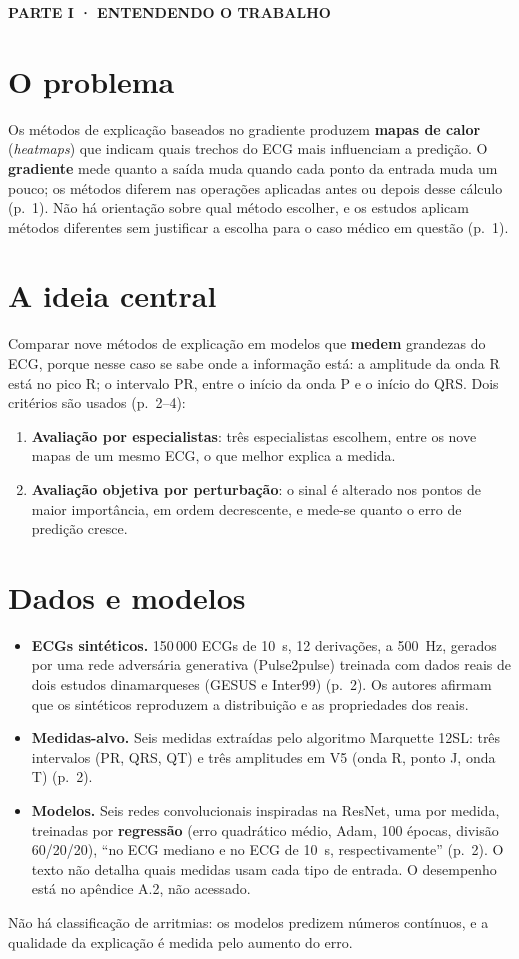 \documentclass[11pt,a4paper]{article}
\newcommand{\partbar}[1]{\par\vspace{1.2em}\noindent\colorbox{black!80}{\parbox{\dimexpr\linewidth-2\fboxsep}{\color{white}\bfseries\sffamily\MakeUppercase{#1}}}\par\vspace{0.4em}}
\begin{document}
\partbar{Parte I · Entendendo o trabalho}

\section{O problema}
Os métodos de explicação baseados no gradiente produzem \textbf{mapas de calor} (\textit{heatmaps}) que indicam quais trechos do ECG mais influenciam a predição. O \textbf{gradiente} mede quanto a saída muda quando cada ponto da entrada muda um pouco; os métodos diferem nas operações aplicadas antes ou depois desse cálculo (p.~1). Não há orientação sobre qual método escolher, e os estudos aplicam métodos diferentes sem justificar a escolha para o caso médico em questão (p.~1).

\section{A ideia central}
Comparar nove métodos de explicação em modelos que \textbf{medem} grandezas do ECG, porque nesse caso se sabe onde a informação está: a amplitude da onda R está no pico R; o intervalo PR, entre o início da onda P e o início do QRS. Dois critérios são usados (p.~2--4):
\begin{enumerate}
\item \textbf{Avaliação por especialistas}: três especialistas escolhem, entre os nove mapas de um mesmo ECG, o que melhor explica a medida.
\item \textbf{Avaliação objetiva por perturbação}: o sinal é alterado nos pontos de maior importância, em ordem decrescente, e mede-se quanto o erro de predição cresce.
\end{enumerate}

\section{Dados e modelos}
\begin{itemize}
\item \textbf{ECGs sintéticos.} 150\,000 ECGs de 10~s, 12 derivações, a 500~Hz, gerados por uma rede adversária generativa (Pulse2pulse) treinada com dados reais de dois estudos dinamarqueses (GESUS e Inter99) (p.~2). Os autores afirmam que os sintéticos reproduzem a distribuição e as propriedades dos reais.
\item \textbf{Medidas-alvo.} Seis medidas extraídas pelo algoritmo Marquette 12SL: três intervalos (PR, QRS, QT) e três amplitudes em V5 (onda R, ponto J, onda T) (p.~2).
\item \textbf{Modelos.} Seis redes convolucionais inspiradas na ResNet, uma por medida, treinadas por \textbf{regressão} (erro quadrático médio, Adam, 100 épocas, divisão 60/20/20), “no ECG mediano e no ECG de 10~s, respectivamente” (p.~2). O texto não detalha quais medidas usam cada tipo de entrada. O desempenho está no apêndice A.2, não acessado.
\end{itemize}
Não há classificação de arritmias: os modelos predizem números contínuos, e a qualidade da explicação é medida pelo aumento do erro.
\end{document}
